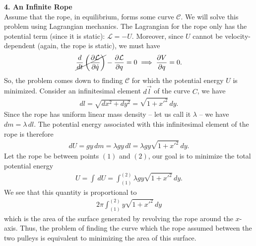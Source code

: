 \documentclass{article}
\theoremstyle{definition}
\newcommand{\p}{\partial}
\newcommand{\lag}{\mathcal{L}}
\newcommand{\f}[2]{\frac{#1}{#2}}
\newcommand{\lp}{\left(}
\newcommand{\rp}{\right)}
\begin{document}
\noindent \textbf{4. An Infinite Rope} \\

\noindent Assume that the rope, in equilibrium, forms some curve $\mathcal{C}$. We will solve this problem using Lagrangian mechanics. The Lagrangian for the rope only has the potential term (since it is static): $\lag = -U$. Moreover, since $U$ cannot be velocity-dependent (again, the rope is static), we must have
\begin{align*}
\cancel{\f{d}{dt}\lp \f{\p \lag}{\p \dot{q}} \rp} - \f{\p \lag}{\p q} = 0\implies  \f{\p V}{\p q} = 0.
\end{align*}
So, the problem comes down to finding $\mathcal{C}$ for which the potential energy $U$ is minimized. Consider an infinitesimal element $d\vec{l}$ of the curve $C$, we have 
\begin{align*}
dl = \sqrt{dx^2 + dy^2} = \sqrt{1+x'^2}\,dy.
\end{align*} 
Since the rope has uniform linear mass density -- let us call it  $\lambda$ -- we have $dm = \lambda \,dl$. The potential energy associated with this infinitesimal element of the rope is therefore
\begin{align*}
dU = gy\,dm = \lambda gy\,dl = \lambda g y \sqrt{1+x'^2}\,dy.
\end{align*}
Let the rope be between points $(1)$ and $(2)$, our goal is to minimize the total potential energy
\begin{align*}
U = \int\,dU =  \int^{(2)}_{(1)} \lambda g y \sqrt{1+x'^2}\,dy.
\end{align*}
We see that this quantity is proportional to 
\begin{align*}
2\pi \int^{(2)}_{(1)} y \sqrt{1+x'^2}\,dy
\end{align*}
which is the area of the surface generated by revolving the rope around the $x$-axis. Thus,  the problem of finding the curve which the rope assumed between the two pulleys is equivalent to minimizing the area of this surface.  \\
\end{document}
